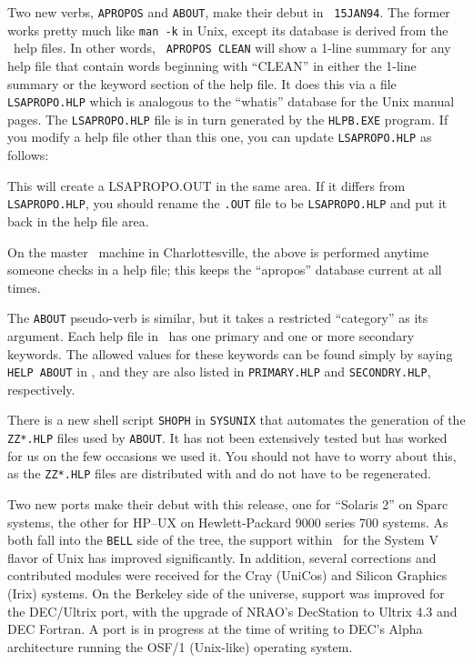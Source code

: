 
Two new verbs, {\tt APROPOS} and {\tt ABOUT}, make their debut in {\tt
15JAN94}.  The former works pretty much like {\tt man -k} in Unix, except
its database is derived from the \AIPS\ help files.  In other words, {\tt
APROPOS CLEAN} will show a 1-line summary for any help file that contain
words beginning with ``CLEAN'' in either the 1-line summary or the keyword
section of the help file.  It does this via a file {\tt LSAPROPO.HLP}
which is analogous to the ``whatis'' database for the Unix manual pages.
The {\tt LSAPROPO.HLP} file is in turn generated by the {\tt HLPB.EXE}
program.  If you modify a help file other than this one, you can update
{\tt LSAPROPO.HLP} as follows:\medskip

\medskip

\noindent This will create a LSAPROPO.OUT in the same area.  If it
differs from {\tt LSAPROPO.HLP}, you should rename the {\tt .OUT} file
to be {\tt LSAPROPO.HLP} and put it back in the help file area.

On the master \AIPS\ machine in Charlottesville, the above is performed
anytime someone checks in a help file; this keeps the ``apropos'' database
current at all times.

The {\tt ABOUT} pseudo-verb is similar, but it takes a restricted
``category'' as its argument.  Each help file in \AIPS\ has one primary
and one or more secondary keywords.  The allowed values for these keywords
can be found simply by saying {\tt HELP ABOUT} in \AIPS, and they are also
listed in {\tt PRIMARY.HLP} and {\tt SECONDRY.HLP}, respectively.

There is a new shell script {\tt SHOPH} in {\tt \dol SYSUNIX} that automates
the generation of the {\tt ZZ*.HLP} files used by {\tt ABOUT}.  It has not
been extensively tested but has worked for us on the few occasions we used
it.  You should not have to worry about this, as the {\tt ZZ*.HLP} files
are distributed with \AIPS and do not have to be regenerated.


Two new ports make their debut with this release, one for ``Solaris 2''
on Sparc systems, the other for HP--UX on Hewlett-Packard 9000 series
700 systems.  As both fall into the {\tt BELL} side of the tree, the
support within \AIPS\ for the System V flavor of Unix has improved
significantly.  In addition, several corrections and contributed modules
were received for the Cray (UniCos) and Silicon Graphics (Irix) systems.
On the Berkeley side of the universe, support was improved for the
DEC/Ultrix port, with the upgrade of NRAO's DecStation to Ultrix 4.3 and
DEC Fortran.  A port is in progress at the time of writing to DEC's
Alpha architecture running the OSF/1 (Unix-like) operating system.

